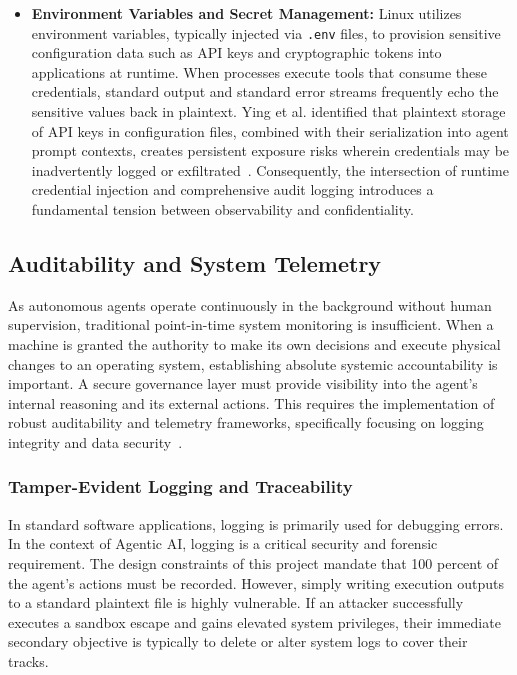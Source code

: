 \documentclass[a4paper]{report}
\begin{document}
\begin{itemize}
    \item \textbf{Environment Variables and Secret Management:} Linux utilizes environment variables, typically injected via \texttt{.env} files, to provision sensitive configuration data such as API keys and cryptographic tokens into applications at runtime. When processes execute tools that consume these credentials, standard output and standard error streams frequently echo the sensitive values back in plaintext. Ying et al. identified that plaintext storage of API keys in configuration files, combined with their serialization into agent prompt contexts, creates persistent exposure risks wherein credentials may be inadvertently logged or exfiltrated~\cite{ying2026uncovering}. Consequently, the intersection of runtime credential injection and comprehensive audit logging introduces a fundamental tension between observability and confidentiality.
\end{itemize}
\subsection{Auditability and System Telemetry}

As autonomous agents operate continuously in the background without human supervision, traditional point-in-time system monitoring is insufficient. When a machine is granted the authority to make its own decisions and execute physical changes to an operating system, establishing absolute systemic accountability is important. A secure governance layer must provide visibility into the agent's internal reasoning and its external actions. This requires the implementation of robust auditability and telemetry frameworks, specifically focusing on logging integrity and data security~\cite{sharma2025agentic}.

\subsubsection{Tamper-Evident Logging and Traceability}

In standard software applications, logging is primarily used for debugging errors. In the context of Agentic AI, logging is a critical security and forensic requirement. The design constraints of this project mandate that 100 percent of the agent's actions must be recorded. However, simply writing execution outputs to a standard plaintext file is highly vulnerable. If an attacker successfully executes a sandbox escape and gains elevated system privileges, their immediate secondary objective is typically to delete or alter system logs to cover their tracks.
\end{document}
